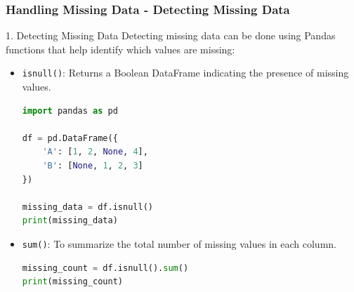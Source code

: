 \documentclass{beamer}
\begin{document}
\begin{frame}[fragile]
    \frametitle{Handling Missing Data - Detecting Missing Data}
    \begin{block}{1. Detecting Missing Data}
        Detecting missing data can be done using Pandas functions that help identify which values are missing:
    \end{block}
    \begin{itemize}
        \item \texttt{isnull()}: Returns a Boolean DataFrame indicating the presence of missing values.
        \begin{lstlisting}[language=Python]
import pandas as pd

df = pd.DataFrame({
    'A': [1, 2, None, 4],
    'B': [None, 1, 2, 3]
})

missing_data = df.isnull()
print(missing_data)
        \end{lstlisting}

        \item \texttt{sum()}: To summarize the total number of missing values in each column.
        \begin{lstlisting}[language=Python]
missing_count = df.isnull().sum()
print(missing_count)
        \end{lstlisting}
    \end{itemize}
\end{frame}
\end{document}
